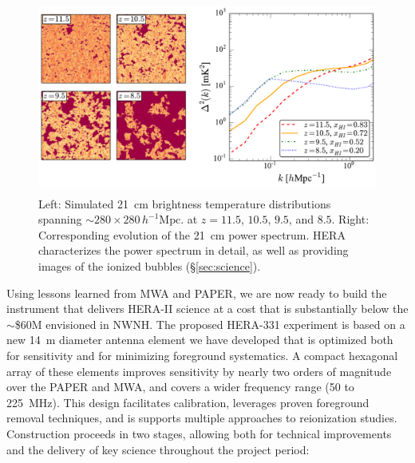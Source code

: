 \documentclass[preprint]{aastex}
\newcommand{\Caption}[4]{\vspace{#1}\renewcommand{\baselinestretch}{#2}\caption{#4}\vspace{#3}}
\begin{document}
\begin{figure}[t]\centering
\includegraphics[height=2.5in]{plots/cubes/cubesAndPspecs.pdf}
\Caption{-0.2in}{0.99}{-0.1in}{\small 
Left: Simulated 21~cm brightness temperature distributions spanning $\sim 280 \times 280\,h^{-1}\textrm{Mpc}$.
at $z=11.5$, $10.5$, $9.5$, and $8.5$.
Right: Corresponding evolution of the 21~cm power spectrum.  HERA
characterizes the power spectrum in detail, as well as
providing images of the ionized bubbles (\S\ref{sec:science}).}
\label{fig:EoRsims} \end{figure}

Using lessons learned from MWA and PAPER, 
we are now ready to build the instrument
that delivers HERA-II science at a cost that is substantially below the $\sim$\$60M envisioned in NWNH.
The proposed HERA-331 experiment is based on
a new 14~m diameter antenna element we have developed that is
optimized both for sensitivity and for minimizing foreground systematics.  
A compact hexagonal array of these elements 
improves sensitivity by nearly two orders of magnitude 
over the PAPER and MWA, and covers a wider frequency range (50 to 225~MHz).
This design facilitates calibration, leverages proven foreground removal techniques, and is supports
multiple approaches to reionization studies. 
Construction proceeds in two stages, allowing both for technical improvements and the delivery of 
key science throughout the project period: 
\end{document}
